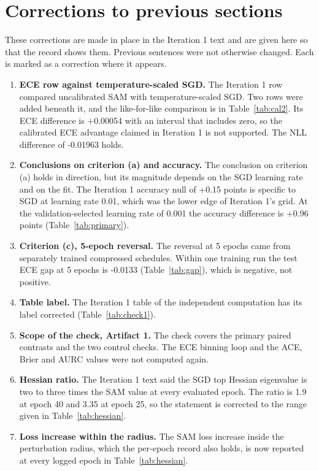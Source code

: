 \documentclass[11pt,letterpaper]{article}
\begin{document}
\section{Corrections to previous sections}

These corrections are made in place in the Iteration 1 text and are given here so that the record shows them. Previous sentences were not otherwise changed. Each is marked as a correction where it appears.

\begin{enumerate}
\item \textbf{ECE row against temperature-scaled SGD.} The Iteration 1 row compared uncalibrated SAM with temperature-scaled SGD. Two rows were added beneath it, and the like-for-like comparison is in Table~\ref{tab:cal2}. Its ECE difference is +0.00054 with an interval that includes zero, so the calibrated ECE advantage claimed in Iteration 1 is not supported. The NLL difference of -0.01963 holds.
\item \textbf{Conclusions on criterion (a) and accuracy.} The conclusion on criterion (a) holds in direction, but its magnitude depends on the SGD learning rate and on the fit. The Iteration 1 accuracy null of +0.15 points is specific to SGD at learning rate 0.01, which was the lower edge of Iteration 1's grid. At the validation-selected learning rate of 0.001 the accuracy difference is +0.96 points (Table~\ref{tab:primary}).
\item \textbf{Criterion (c), 5-epoch reversal.} The reversal at 5 epochs came from separately trained compressed schedules. Within one training run the test ECE gap at 5 epochs is -0.0133 (Table~\ref{tab:gap}), which is negative, not positive.
\item \textbf{Table label.} The Iteration 1 table of the independent computation has its label corrected (Table~\ref{tab:check1}).
\item \textbf{Scope of the check, Artifact 1.} The check covers the primary paired contrasts and the two control checks. The ECE binning loop and the ACE, Brier and AURC values were not computed again.
\item \textbf{Hessian ratio.} The Iteration 1 text said the SGD top Hessian eigenvalue is two to three times the SAM value at every evaluated epoch. The ratio is 1.9 at epoch 40 and 3.35 at epoch 25, so the statement is corrected to the range given in Table~\ref{tab:hessian}.
\item \textbf{Loss increase within the radius.} The SAM loss increase inside the perturbation radius, which the per-epoch record also holds, is now reported at every logged epoch in Table~\ref{tab:hessian}.

\end{enumerate}
\end{document}

